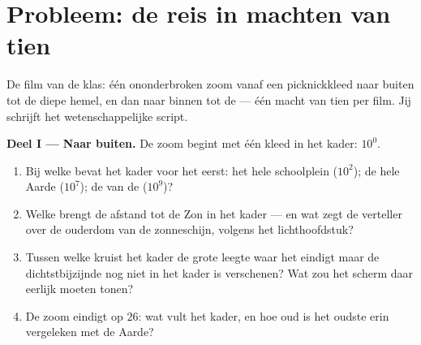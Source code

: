 \section{Probleem: de reis in machten van tien}

\begin{problem}\label{pb:g9:atoms-to-galaxies:1}
De film van de klas: één ononderbroken zoom vanaf een picknickkleed
naar buiten tot de diepe hemel, en dan naar binnen tot de
 --- één macht van tien per  film. Jij schrijft het
wetenschappelijke script.

\medskip\noindent\textbf{Deel I --- Naar buiten.}
De zoom begint met één  kleed in het kader: $10^{0}$.
\begin{enumerate}
  \item Bij welke  bevat het kader voor het eerst: het hele
        schoolplein ($10^{2}$); de hele Aarde ($10^{7}$); de
         van de  ($10^{9}$)?
  \item Welke  brengt de afstand tot de Zon in het kader --- en wat
        zegt de verteller over de ouderdom van de zonneschijn, volgens
        het lichthoofdstuk?
  \item Tussen welke  kruist het kader de grote leegte waar
        het  eindigt maar de dichtstbijzijnde
         nog niet in het kader is verschenen? Wat zou het scherm
        daar eerlijk moeten tonen?
  \item De zoom eindigt op  $26$: wat vult het kader, en hoe
        oud is het oudste  erin vergeleken met de Aarde?
\end{enumerate}


\end{problem}
